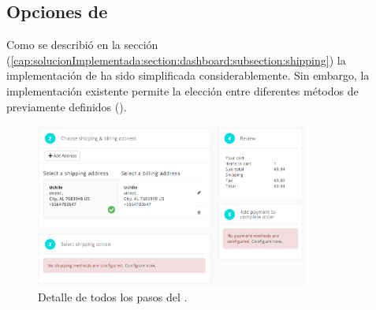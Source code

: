 \subsection{Opciones de \ShippingCOM}\label{chapter:solucionimplementada:section:shipping_options}

	Como se describió en la sección  (\ref{cap:solucionImplementada:section:dashboard:subsection:shipping}) la implementación de \ShippingCOM ha sido simplificada considerablemente. Sin embargo, la implementación existente permite la elección entre diferentes métodos de \ShippingCOM previamente definidos (). 

	\begin{figure}[!h]
		\centering
		\includegraphics[width=0.8\textwidth]{figuras/shipping/steps.png}
		\caption{Detalle de todos los pasos del \workflowCPT \shippingEF.}
		\label{figure:shipping:checkout:select_option}
	\end{figure}